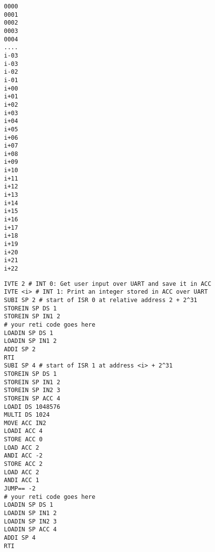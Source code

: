 \documentclass{article}
\newenvironment{adjustedminipage}[1]
{\vspace{0.1cm}\begin{minipage}[t]{#1}}
  {\end{minipage}\vspace{0.1cm}}
\begin{document}
\begin{adjustedminipage}{0.1\textwidth}
\begin{verbatim}
0000 
0001 
0002 
0003 
0004 
.... 
i-03 
i-03 
i-02 
i-01 
i+00 
i+01 
i+02 
i+03 
i+04 
i+05 
i+06 
i+07 
i+08 
i+09 
i+10 
i+11 
i+12 
i+13 
i+14 
i+15 
i+16 
i+17 
i+18 
i+19 
i+20 
i+21 
i+22 
\end{verbatim}
\end{adjustedminipage}
\begin{adjustedminipage}{0.8\textwidth}
\begin{verbatim}
IVTE 2 # INT 0: Get user input over UART and save it in ACC
IVTE <i> # INT 1: Print an integer stored in ACC over UART 
SUBI SP 2 # start of ISR 0 at relative address 2 + 2^31    
STOREIN SP DS 1                                            
STOREIN SP IN1 2                                           
# your reti code goes here                                 
LOADIN SP DS 1                                             
LOADIN SP IN1 2                                            
ADDI SP 2                                                  
RTI                                                        
SUBI SP 4 # start of ISR 1 at address <i> + 2^31           
STOREIN SP DS 1                                            
STOREIN SP IN1 2                                           
STOREIN SP IN2 3                                           
STOREIN SP ACC 4                                           
LOADI DS 1048576                                           
MULTI DS 1024                                              
MOVE ACC IN2                                               
LOADI ACC 4                                                
STORE ACC 0                                                
LOAD ACC 2                                                 
ANDI ACC -2                                                
STORE ACC 2                                                
LOAD ACC 2                                                 
ANDI ACC 1                                                 
JUMP== -2                                                  
# your reti code goes here                                      
LOADIN SP DS 1                                             
LOADIN SP IN1 2                                            
LOADIN SP IN2 3                                            
LOADIN SP ACC 4                                            
ADDI SP 4                                                  
RTI                                                        
\end{verbatim}
\end{adjustedminipage}
\end{document}
